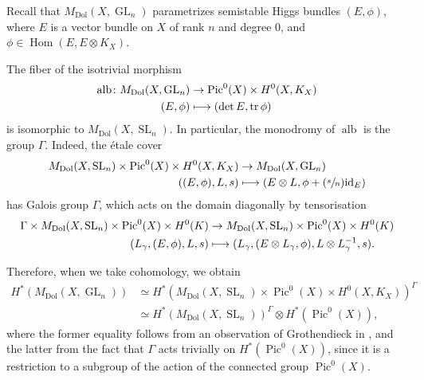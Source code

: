 \documentclass[JEP,XML,SOM,Unicode, NoEqCountersInSection,NoFloatCountersInSection,published]{cedram}
\newcommand{\Psfrac}[2]{(\sfrac{#1}{#2})}
\newcommand\mto{\mathchoice{\longmapsto}{\mapsto}{\mapsto}{\mapsto}}
\theoremstyle{definition}
\newcommand{\alb}{\operatorname{alb}}
\newcommand{\Gl}{\operatorname{GL}}
\newcommand{\Sl}{\operatorname{SL}}
\newcommand{\Hom}{\operatorname{Hom}}
\newcommand{\Tr}{\operatorname{tr}}
\newcommand{\Pic}{\operatorname{Pic}}
\newcommand{\MDolGl}{{M}_{\mathrm{Dol}}(X, \Gl_n)}
\newcommand{\MDolSl}{{M}_{\mathrm{Dol}}(X, \Sl_n)}
\begin{document}
Recall that $\MDolGl$ parametrizes semistable Higgs bundles $(E, \phi)$, where $E$ is a vector bundle on $X$ of rank $n$ and degree $0$, and $\phi \in \Hom(E, E \otimes K_X)$.

The fiber of the isotrivial morphism
\begin{equation}
\begin{aligned}
\alb\colon \MDolGl & \to \Pic^0(X) \times H^0(X, K_X) \label{eq:alb}\\
(E, \phi) & \mto (\det E, \Tr \phi)
\end{aligned}
\end{equation}
is isomorphic to $\MDolSl$. In particular, the monodromy of $\alb$ is the group $\Gamma$. Indeed, the étale cover
\begin{equation}
\begin{aligned}
\MDolSl \times \Pic^0(X) \times H^0(X, K_X) & \to \MDolGl\label{eq:etalecoverMDolSLGL}\\
((E, \phi), L, s) & \mto (E \otimes L, \phi + \Psfrac{s}{n}\mathrm{id}_{E})
\end{aligned}
\end{equation}
has Galois group $\Gamma$, which acts on the domain diagonally by tensorisation
\begin{align*}
\Gamma \times \MDolSl \times \Pic^0(X) \times H^0(K) & \to \MDolSl \times \Pic^0(X) \times H^0(K)\\
(L_{\gamma}, (E, \phi), L, s) & \mto (L_{\gamma}, (E \otimes L_{\gamma}, \phi), L \otimes L^{-1}_{\gamma}, s).
\end{align*}

Therefore, when we take cohomology, we obtain
\begin{equation}
\begin{aligned}
H^*(\MDolGl)& \simeq H^*(\MDolSl \times \Pic^0(X) \times H^0(X, K_X))^{\Gamma} \\
& \simeq H^*(\MDolSl)^{\Gamma} \otimes H^*( \Pic^0(X)), \label{eq:cohomMGLDol}
\end{aligned}
\end{equation}
where the former equality follows from an observation of Grothendieck in \cite{Grothendieck_1957}, and the latter from the fact that $\Gamma$ acts trivially on $H^*(\Pic^0(X))$, since it is a restriction to a subgroup of the action of the connected group $\Pic^0(X)$.
\end{document}
